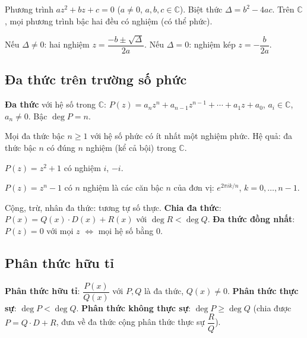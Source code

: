 \documentclass[12pt,a4paper]{article}
\begin{document}
\begin{dinhnghia}
  Phương trình $az^2 + bz + c = 0$ ($a \ne 0$, $a, b, c \in \mathbb{C}$). Biệt thức $\Delta = b^2 - 4ac$. Trên $\mathbb{C}$, mọi phương trình bậc hai đều có nghiệm (có thể phức).
\end{dinhnghia}

\begin{congthuc}
  Nếu $\Delta \ne 0$: hai nghiệm $z = \dfrac{-b \pm \sqrt{\Delta}}{2a}$. Nếu $\Delta = 0$: nghiệm kép $z = -\dfrac{b}{2a}$.
\end{congthuc}

\subsection{Đa thức trên trường số phức}

\begin{dinhnghia}
  \textbf{Đa thức} với hệ số trong $\mathbb{C}$: $P(z) = a_n z^n + a_{n-1} z^{n-1} + \cdots + a_1 z + a_0$, $a_i \in \mathbb{C}$, $a_n \ne 0$. Bậc $\deg P = n$.
\end{dinhnghia}

\begin{dinhly}[title={Định lý cơ bản của đại số}]
  Mọi đa thức bậc $n \ge 1$ với hệ số phức có ít nhất một nghiệm phức. Hệ quả: đa thức bậc $n$ có đúng $n$ nghiệm (kể cả bội) trong $\mathbb{C}$.
\end{dinhly}

\begin{vidu}
  $P(z) = z^2 + 1$ có nghiệm $i$, $-i$. 
  
  $P(z) = z^n - 1$ có $n$ nghiệm là các căn bậc $n$ của đơn vị: $e^{2\pi ik/n}$, $k = 0, \ldots, n-1$.
\end{vidu}

\begin{tinhchat}[title={Phép toán trên đa thức}]
  Cộng, trừ, nhân đa thức: tương tự số thực. \textbf{Chia đa thức}: $P(x) = Q(x) \cdot D(x) + R(x)$ với $\deg R < \deg Q$. \textbf{Đa thức đồng nhất}: $P(z) = 0$ với mọi $z$ $\Leftrightarrow$ mọi hệ số bằng 0.
\end{tinhchat}

\subsection{Phân thức hữu tỉ}

\begin{dinhnghia}
  \textbf{Phân thức hữu tỉ}: $\dfrac{P(x)}{Q(x)}$ với $P, Q$ là đa thức, $Q(x) \ne 0$. \textbf{Phân thức thực sự}: $\deg P < \deg Q$. \textbf{Phân thức không thực sự}: $\deg P \ge \deg Q$ (chia được $P = Q \cdot D + R$, đưa về đa thức cộng phân thức thực sự $\dfrac{R}{Q}$).
\end{dinhnghia}
\end{document}
